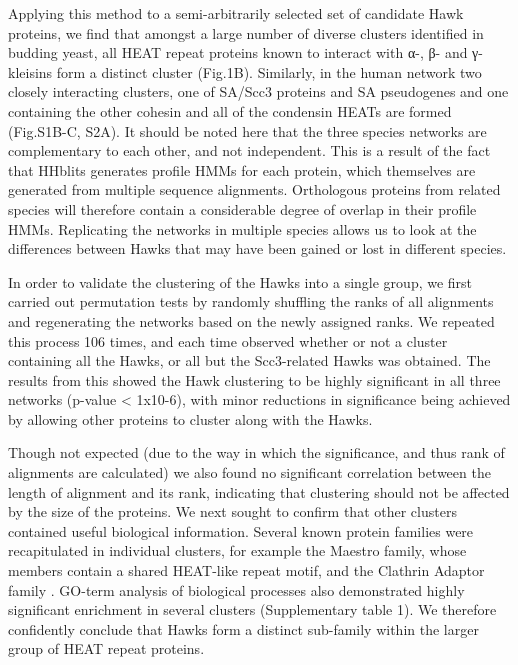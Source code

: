 \documentclass[a4paper,11pt,twoside,openright]{scrbook}
\begin{document}
Applying this method to a semi-arbitrarily selected set of candidate Hawk proteins, we find that amongst a large number of diverse clusters identified in budding yeast, all HEAT repeat proteins known to interact with α-, β- and γ- kleisins \cite{Nasmyth2009, Hirano2016} form a distinct cluster  (Fig.1B). Similarly, in the human network two closely interacting clusters, one of SA/Scc3 proteins and SA pseudogenes and one containing the other cohesin and all of the condensin HEATs are formed (Fig.S1B-C, S2A). It should be noted here that the three species networks are complementary to each other, and not independent. This is a result of the fact that HHblits generates profile HMMs for each protein, which themselves are generated from multiple sequence alignments. Orthologous proteins from related species will therefore contain a considerable degree of overlap in their profile HMMs. Replicating the networks in multiple species allows us to look at the differences between Hawks that may have been gained or lost in different species.

In order to validate the clustering of the Hawks into a single group, we first carried out permutation tests by randomly shuffling the ranks of all alignments and regenerating the networks based on the newly assigned ranks. We repeated this process 106 times, and each time observed whether or not a cluster containing all the Hawks, or all but the Scc3-related Hawks was obtained. The results from this showed the Hawk clustering to be highly significant in all three networks (p-value < 1x10-6), with minor reductions in significance being achieved by allowing other proteins to cluster along with the Hawks.

Though not expected (due to the way in which the significance, and thus rank of alignments are calculated) we also found no significant correlation between the length of alignment and its rank, indicating that clustering should not be affected by the size of the proteins. We next sought to confirm that other clusters contained useful biological information. Several known protein families were recapitulated in individual clusters, for example the Maestro family, whose members contain a shared HEAT-like repeat motif, and the Clathrin Adaptor family \cite{Smith2003a, McMahon2004}. GO-term analysis of biological processes also demonstrated highly significant enrichment in several clusters (Supplementary table 1). We therefore confidently conclude that Hawks form a distinct sub-family within the larger group of HEAT repeat proteins.
\end{document}
